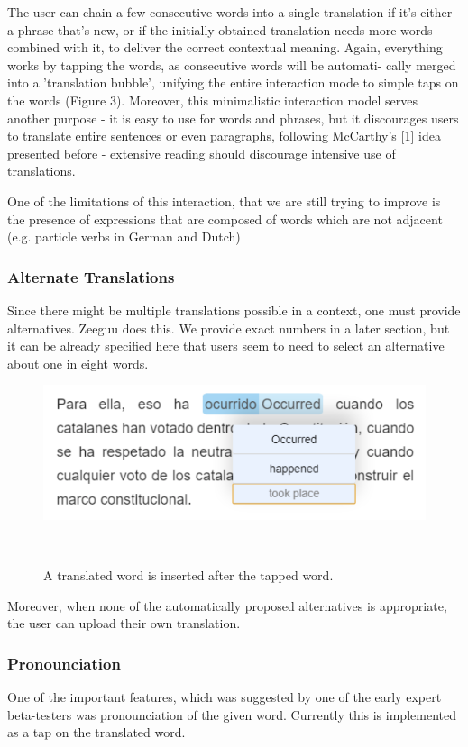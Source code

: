 The user can chain a few consecutive words into a single translation if it’s either a phrase that’s new, or if the initially obtained translation needs more words combined with it, to deliver the correct contextual meaning. Again, everything works by tapping the words, as consecutive words will be automati- cally merged into a ’translation bubble’, unifying the entire interaction mode to simple taps on the words (Figure 3). Moreover, this minimalistic interaction model serves another purpose - it is easy to use for words and phrases, but it discourages users to translate entire sentences or even paragraphs, following McCarthy’s [1] idea presented before - extensive reading should discourage intensive use of translations.

One of the limitations of this interaction, that we are still trying to improve is the presence of expressions that are composed of words which are not adjacent (e.g. particle verbs in German and Dutch)


\subsubsection{Alternate Translations}
Since there might be multiple translations possible in a context, one must provide alternatives. Zeeguu does this. We provide exact numbers in a later section, but it can be already specified here that users seem to need to select an alternative about one in eight words.

\begin{figure}[h!]
\centering
  \includegraphics[width=0.8\columnwidth]{figures/translation_alter_menu}
  \caption{A translated word is inserted after the tapped word.}~\label{fig:registrations}
\end{figure}

Moreover, when none of the automatically proposed alternatives is appropriate, the user can upload their own translation.


\subsubsection{Pronounciation}
One of the important features, which was suggested by one of the early expert beta-testers was pronounciation of the given word. Currently this is implemented as a tap on the translated word.


